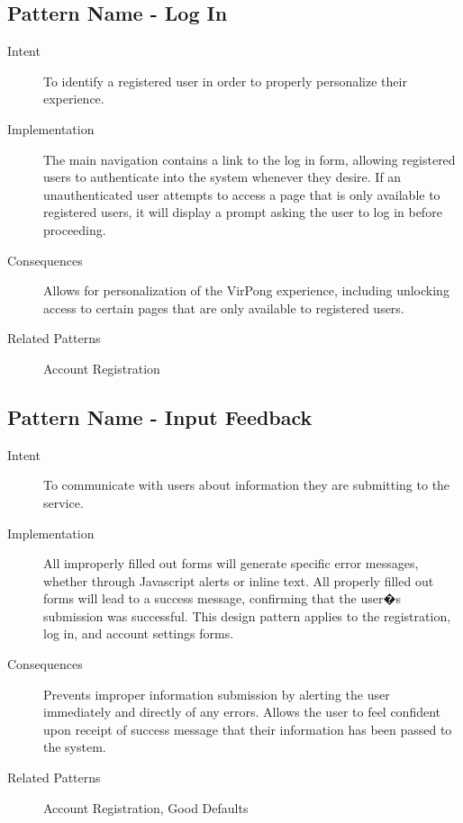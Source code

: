 \subsection{Pattern Name - Log In}
\begin{description}
\item[Intent] To identify a registered user in order to properly personalize their experience.
\item[Implementation] The main navigation contains a link to the log in form, allowing registered users to authenticate into the system whenever they desire. If an unauthenticated user attempts to access a page that is only available to registered users, it will display a prompt asking the user to log in before proceeding.
\item[Consequences] Allows for personalization of the VirPong experience, including unlocking access to certain pages that are only available to registered users.
\item[Related Patterns] Account Registration
\end{description}
\subsection{Pattern Name - Input Feedback}
\begin{description}
\item[Intent] To communicate with users about information they are submitting to the service.
\item[Implementation] All improperly filled out forms will generate specific error messages, whether through Javascript alerts or inline text. All properly filled out forms will lead to a success message, confirming that the user�s submission was successful. This design pattern applies to the registration, log in, and account settings forms.
\item[Consequences] Prevents improper information submission by alerting the user immediately and directly of any errors. Allows the user to feel confident upon receipt of success message that their information has been passed to the system.
\item[Related Patterns] Account Registration, Good Defaults
\end{description}
